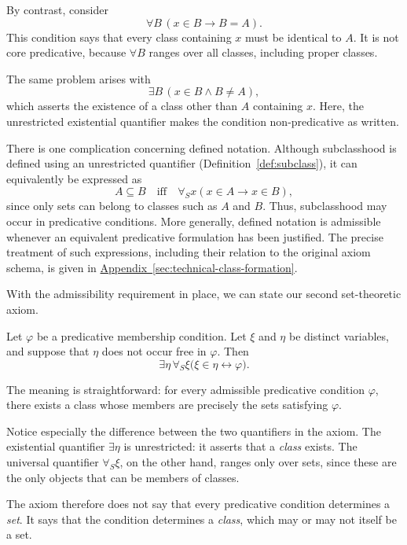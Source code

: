 By contrast, consider
\[
\forall B\,(x\in B\to B=A).
\]
This condition says that every class containing \(x\) must be identical to \(A\). It is not core predicative, because \(\forall B\) ranges over all classes, including proper classes.

The same problem arises with
\[
\exists B\,(x\in B\land B\neq A),
\]
which asserts the existence of a class other than \(A\) containing \(x\). Here, the unrestricted existential quantifier makes the condition non-predicative as written.

There is one complication concerning defined notation. Although subclasshood is defined using an unrestricted quantifier (Definition~\ref{def:subclass}), it can equivalently be expressed as
\[
A\subseteq B
\quad\text{iff}\quad
\forall_S x(x\in A\to x\in B),
\]
since only sets can belong to classes such as \(A\) and \(B\). Thus, subclasshood may occur in predicative conditions. More generally, defined notation is admissible whenever an equivalent predicative formulation has been justified. The precise treatment of such expressions, including their relation to the original axiom schema, is given in \hyperref[sec:technical-class-formation]{Appendix~\ref*{sec:technical-class-formation}}.

With the admissibility requirement in place, we can state our second set-theoretic axiom.

\begin{axiom}
\label{ax:class-formation}
Let \(\varphi\) be a predicative membership condition. Let \(\xi\) and \(\eta\) be distinct variables, and suppose that \(\eta\) does not occur free in \(\varphi\). Then
\[
\exists\eta\,
\forall_S\xi
\bigl(
\xi\in\eta
\leftrightarrow
\varphi
\bigr).
\]
\end{axiom}

The meaning is straightforward: for every admissible predicative condition \(\varphi\), there exists a class whose members are precisely the sets satisfying \(\varphi\).

Notice especially the difference between the two quantifiers in the axiom. The existential quantifier \(\exists\eta\) is unrestricted: it asserts that a \emph{class} exists. The universal quantifier \(\forall_S\xi\), on the other hand, ranges only over sets, since these are the only objects that can be members of classes.

The axiom therefore does not say that every predicative condition determines a \textit{set}. It says that the condition determines a \textit{class}, which may or may not itself be a set.

